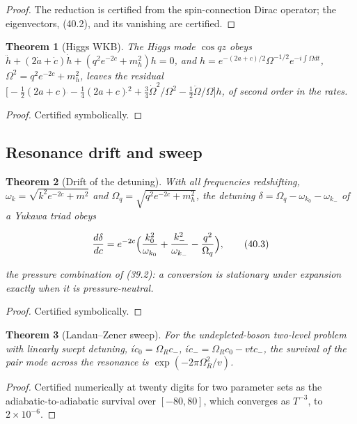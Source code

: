 \documentclass[11pt]{article}
\newtheorem{theorem}{Theorem}[section]
\theoremstyle{remark}
\begin{document}
\begin{proof}
The reduction is certified from the spin-connection Dirac operator;
the eigenvectors, (40.2), and its vanishing are certified.
\end{proof}

\begin{theorem}[Higgs WKB]
\label{thm:v20v37-wkb}
The Higgs mode \(\cos qz\) obeys
\(\ddot h+(2\dot a+\dot c)\dot h+(q^2e^{-2c}+m_h^2)h=0\), and
\(h=e^{-(2a+c)/2}\Omega^{-1/2}e^{-i\int\Omega dt}\), \(\Omega^2=q^2e^{-2c}+m_h^2\),
leaves the residual
\(\bigl[-\tfrac12(2a+c)\ddot{}-\tfrac14(2a+c)\dot{}^2+\tfrac34\dot\Omega^2/\Omega^2-\tfrac12\ddot\Omega/\Omega\bigr]h\),
of second order in the rates.
\end{theorem}

\begin{proof}
Certified symbolically.
\end{proof}

\subsection{Resonance drift and sweep}

\begin{theorem}[Drift of the detuning]
\label{thm:v20v37-drift}
With all frequencies redshifting, \(\omega_k=\sqrt{k^2e^{-2c}+m^2}\) and
\(\Omega_q=\sqrt{q^2e^{-2c}+m_h^2}\), the detuning
\(\delta=\Omega_q-\omega_{k_0}-\omega_{k_-}\) of a Yukawa triad obeys

\[
 \frac{d\delta}{dc}=e^{-2c}\Bigl(\frac{k_0^2}{\omega_{k_0}}+\frac{k_-^2}{\omega_{k_-}}-\frac{q^2}{\Omega_q}\Bigr),
                                                                    \tag{40.3}
\]

the pressure combination of (39.2): a conversion is stationary under
expansion exactly when it is pressure-neutral.
\end{theorem}

\begin{proof}
Certified symbolically.
\end{proof}

\begin{theorem}[Landau--Zener sweep]
\label{thm:v20v37-lz}
For the undepleted-boson two-level problem with linearly swept
detuning, \(i\dot c_0=\Omega_Rc_-\), \(i\dot c_-=\Omega_Rc_0-vtc_-\), the
survival of the pair mode across the resonance is
\(\exp(-2\pi\Omega_R^2/v)\).
\end{theorem}

\begin{proof}
Certified numerically at twenty digits for two parameter sets as
the adiabatic-to-adiabatic survival over \([-80,80]\), which
converges as \(T^{-3}\), to \(2\times10^{-6}\).
\end{proof}
\end{document}
